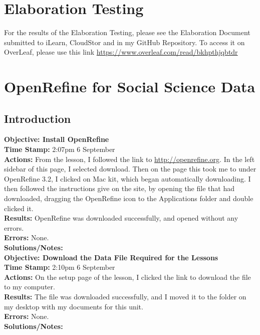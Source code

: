 \documentclass{article}
\begin{document}
\begin{FlushLeft}
\section{Elaboration Testing}
For the results of the Elaboration Testing, please see the Elaboration Document submitted to iLearn, CloudStor and in my GitHub Repository. To access it on OverLeaf, please use this link \url{https://www.overleaf.com/read/bkhpthjqbtdr}

\section{OpenRefine for Social Science Data}
\subsection{Introduction}
\textbf{Objective: Install OpenRefine}\\ 
\textbf{Time Stamp:} 2:07pm 6 September\\
\textbf{Actions:} From the lesson, I followed the link to \url{http://openrefine.org}. In the left sidebar of this page, I selected download. Then on the page this took me to under OpenRefine 3.2, I clicked on Mac kit, which began automatically downloading. I then followed the instructions give on the site, by opening the file that had downloaded, dragging the OpenRefine icon to the Applications folder and double clicked it. \\
\textbf{Results:} OpenRefine was downloaded successfully, and opened without any errors. \\
\textbf{Errors:} None.\\
\textbf{Solutions/Notes:}\\
\vspace{5mm}
\textbf{Objective: Download the Data File Required for the Lessons}\\ 
\textbf{Time Stamp:} 2:10pm 6 September\\
\textbf{Actions:} On the setup page of the lesson, I clicked the link to download the file to my computer.\\
\textbf{Results:} The file was downloaded successfully, and I moved it to the folder on my desktop with my documents for this unit. \\
\textbf{Errors:} None.\\
\textbf{Solutions/Notes:}\\
\vspace{5mm}


\end{FlushLeft}
\end{document}
